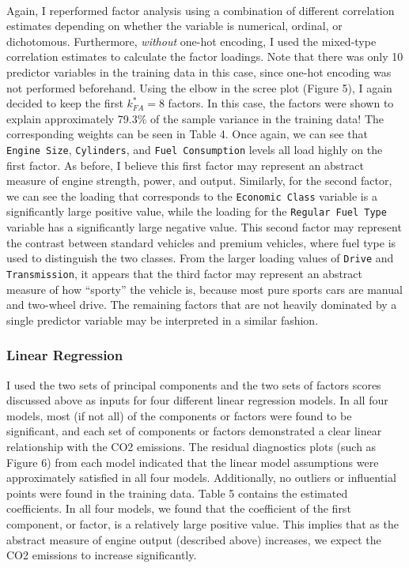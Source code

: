 \documentclass[11pt]{article}
\begin{document}
\

Again, I reperformed factor analysis using a combination of different correlation estimates depending on whether the variable is numerical, ordinal, or dichotomous. Furthermore, \textit{without} one-hot encoding, I used the mixed-type correlation estimates to calculate the factor loadings. Note that there was only 10 predictor variables in the training data in this case, since one-hot encoding was not performed beforehand. Using the elbow in the scree plot (Figure 5), I again decided to keep the first $k_{FA}^* = 8$ factors. In this case, the factors were shown to explain approximately 79.3\% of the sample variance in the training data! The corresponding weights can be seen in Table 4. Once again, we can see that \texttt{Engine Size}, \texttt{Cylinders}, and \texttt{Fuel Consumption} levels all load highly on the first factor. As before, I believe this first factor may represent an abstract measure of engine strength, power, and output. Similarly, for the second factor, we can see the loading that corresponds to the \texttt{Economic Class} variable is a significantly large positive value, while the loading for the \texttt{Regular Fuel Type} variable has a significantly large negative value. This second factor may represent the contrast between standard vehicles and premium vehicles, where fuel type is used to distinguish the two classes. From the larger loading values of \texttt{Drive} and \texttt{Transmission}, it appears that the third factor may represent an abstract measure of how ``sporty'' the vehicle is, because most pure sports cars are manual and two-wheel drive. The remaining factors that are not heavily dominated by a single predictor variable may be interpreted in a similar fashion.

\subsubsection*{Linear Regression}

I used the two sets of principal components and the two sets of factors scores discussed above as inputs for four different linear regression models. In all four models, most (if not all) of the components or factors were found to be significant, and each set of components or factors demonstrated a clear linear relationship with the CO2 emissions. The residual diagnostics plots (such as Figure 6) from each model indicated that the linear model assumptions were approximately satisfied in all four models. Additionally, no outliers or influential points were found in the training data. Table 5 contains the estimated coefficients. In all four models, we found that the coefficient of the first component, or factor, is a relatively large positive value. This implies that as the abstract measure of engine output (described above) increases, we expect the CO2 emissions to increase significantly. 
\end{document}
